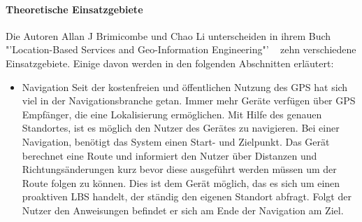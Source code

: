 \paragraph{Theoretische Einsatzgebiete}
Die Autoren Allan J Brimicombe und Chao Li unterscheiden in ihrem Buch "'Location-Based Services and Geo-Information Engineering"' ~\cite[S.132]{brimicombe_li:application_area} zehn verschiedene Einsatzgebiete. Einige davon werden in den folgenden Abschnitten erläutert:
\begin{itemize}
	\item Navigation
Seit der kostenfreien und öffentlichen Nutzung des GPS hat sich viel in der Navigationsbranche getan. Immer mehr Geräte verfügen über GPS Empfänger, die eine Lokalisierung ermöglichen. Mit Hilfe des genauen Standortes, ist es möglich den Nutzer des Gerätes zu navigieren. Bei einer Navigation, benötigt das System einen Start- und Zielpunkt. Das Gerät berechnet eine Route und informiert den Nutzer über Distanzen und Richtungsänderungen kurz bevor diese ausgeführt werden müssen um der Route folgen zu können. Dies ist dem Gerät möglich, das es sich um einen proaktiven LBS handelt, der ständig den eigenen Standort abfragt. Folgt der Nutzer den Anweisungen befindet er sich am Ende der Navigation am Ziel.


\end{itemize}
